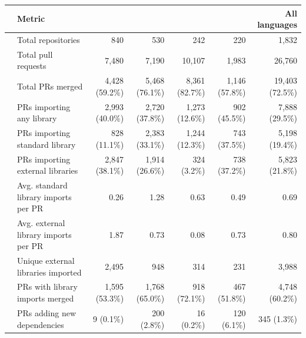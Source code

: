 
\begin{tabular}{@{}c|p{5cm}|r|r|r|r|r|}
  & \textbf{Metric} &  &  &  &  & \textbf{All languages} \\
\hline
{} & Total repositories & 840 & 530 & 242 & 220 & 1,832 \\
 & Total pull requests & 7,480 & 7,190 & 10,107 & 1,983 & 26,760 \\
 & Total PRs merged & 4,428 (59.2\%) & 5,468 (76.1\%) & 8,361 (82.7\%) & 1,146 (57.8\%) & 19,403 (72.5\%) \\
\hline
{} & PRs importing any library & 2,993 (40.0\%) & 2,720 (37.8\%) & 1,273 (12.6\%) & 902 (45.5\%) & 7,888 (29.5\%) \\
 & PRs importing standard library & 828 (11.1\%) & 2,383 (33.1\%) & 1,244 (12.3\%) & 743 (37.5\%) & 5,198 (19.4\%) \\
 & PRs importing external libraries & 2,847 (38.1\%) & 1,914 (26.6\%) & 324 (3.2\%) & 738 (37.2\%) & 5,823 (21.8\%) \\
 & Avg. standard library imports per PR & 0.26 & 1.28 & 0.63 & 0.49 & 0.69 \\
 & Avg. external library imports per PR & 1.87 & 0.73 & 0.08 & 0.73 & 0.80 \\
 & Unique external libraries imported & 2,495 & 948 & 314 & 231 & 3,988 \\
 & PRs with library imports merged & 1,595 (53.3\%) & 1,768 (65.0\%) & 918 (72.1\%) & 467 (51.8\%) & 4,748 (60.2\%) \\
\hline
{} & PRs adding new dependencies & 9 (0.1\%) & 200 (2.8\%) & 16 (0.2\%) & 120 (6.1\%) & 345 (1.3\%) \\

\end{tabular}
